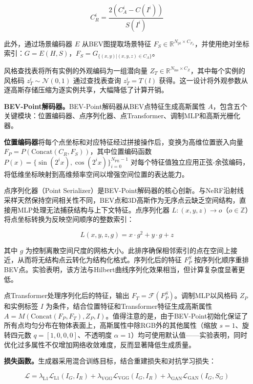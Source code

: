 \begin{equation}
C_R^i = \frac{2(C_A^i - C(I^i))}{S(I^i)}
\end{equation}

此外，通过场景编码器 $E$ 从BEV图提取场景特征 $F_S \in \mathbb{R}^{N_{\text{pt}} \times C_{F_S}}$，并使用绝对坐标索引：$G = E(H, S)$，$F_S = G_{\{(x,y) | (x,y,z) \in C_A\}}$。

风格查找表将所有实例的外观编码为一组潜向量 $Z_T \in \mathbb{R}^{N_{\text{ins}} \times C_Z}$，其中每个实例的风格码 $z_T^i \sim \mathcal{N}(0,1)$ 通过查找表查询 $z_T^i = T(l)$ 获得。这一设计将外观参数从逐高斯存储压缩为逐实例共享，大幅降低了计算开销。

\textbf{BEV-Point解码器。}BEV-Point解码器从BEV点特征生成高斯属性 $A$，包含五个关键模块：位置编码器、点序列化器、点Transformer、调制MLP和高斯光栅化器。

\textbf{位置编码器}将每个点坐标和对应特征经过拼接操作后，变换为高维位置嵌入向量 $F_P = P(\text{Concat}(C_R, F_S))$，其中位置编码函数 $P(x) = \{\sin(2^i x), \cos(2^i x)\}_{i=0}^{N_{\text{PE}}-1}$ 对每个特征值独立应用正弦-余弦编码，将低维坐标映射到高维频率空间以增强空间位置的表达能力。

点序列化器（Point Serializer）是BEV-Point解码器的核心创新。与NeRF沿射线采样天然保持空间相关性不同，BEV点和3D高斯作为无序点云缺乏空间结构，直接用MLP处理无法捕获结构与上下文特征。点序列化器 $L: (x,y,z) \to o$（$o \in \mathbb{Z}$）将点坐标转换为反映空间顺序的整数索引：

\begin{equation}
L(x, y, z, g) = x \cdot g^2 + y \cdot g + z
\end{equation}

其中 $g$ 为控制离散空间尺度的网格大小。此排序确保相邻索引的点在空间上接近，从而将无结构点云转化为结构化格式。序列化后的特征 $F_P^S$ 按序列化顺序重排BEV点。实验表明，该方法与Hilbert曲线序列化效果相当，但计算复杂度显著更低。

点Transformer处理序列化后的特征，输出 $F_T = \mathcal{F}(F_P^S)$。调制MLP以风格码 $Z_P$ 和实例标签 $I$ 为条件，结合位置特征和Transformer特征生成高斯属性 $A = M(\text{Concat}(F_P, F_T), Z_P, I)$。值得注意的是，由于BEV-Point初始化保证了所有点均匀分布在物体表面上，高斯属性中除RGB外的其他属性（缩放 $s=1$、旋转四元数 $q=[1,0,0,0]$、不透明度 $\alpha=1$）均可使用默认值——实验表明，同时优化过多属性不仅增加网络收敛难度，反而显著降低生成质量。

\textbf{损失函数。}生成器采用混合训练目标，结合重建损失和对抗学习损失：

\begin{equation}
\mathcal{L} = \lambda_{\text{L1}} \mathcal{L}_{\text{L1}}(I_G, I_R) + \lambda_{\text{VGG}} \mathcal{L}_{\text{VGG}}(I_G, I_R) + \lambda_{\text{GAN}} \mathcal{L}_{\text{GAN}}(I_G, S_G)
\end{equation}

